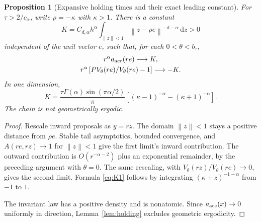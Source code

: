 \documentclass[pdflatex,iicol,sn-mathphys-ay]{sn-jnl}
\newtheorem{proposition}[theorem]{Proposition}
\theoremstyle{definition}\newtheorem{definition}[theorem]{Definition}
\theoremstyle{remark}\newtheorem{remark}[theorem]{Remark}
\numberwithin{equation}{section}
\newcommand{\norm}[1]{\left\lVert#1\right\rVert}\newcommand{\TV}{\mathrm{TV}}
\newcommand{\dd}{\,\mathrm d}\newcommand{\cA}{c_\alpha}\newcommand{\sg}{\operatorname{sigmoid}}
\newcommand{\1}{\mathbf 1}
\begin{document}
\begin{proposition}[Expansive holding times and their exact leading constant]\label{prop:holding}
For $\tau>2/\cA$, write $\rho=-\kappa$ with $\kappa>1$. There is a constant
\begin{equation}
K=C_{d,\alpha}h^\alpha\int_{\norm z<1}\norm{z-\rho e}^{-d-\alpha}\dd z>0\label{eq:K}
\end{equation}
independent of the unit vector $e$, such that, for each $0<\theta<b_\tau$,
\begin{equation}
\begin{gathered}
r^\alpha a_{\rm acc}(re)\longrightarrow K,\\
r^\alpha\left[PV_\theta(re)/V_\theta(re)-1\right]\longrightarrow-K.
\end{gathered}\label{eq:holdinglimits}
\end{equation}
In one dimension,
\begin{equation}
K=\frac{\tau\Gamma(\alpha)\sin(\pi\alpha/2)}{\pi}
\left[(\kappa-1)^{-\alpha}-(\kappa+1)^{-\alpha}\right].\label{eq:K1}
\end{equation}
The chain is not geometrically ergodic.
\end{proposition}
\begin{proof}
Rescale inward proposals as $y=rz$. The domain $\norm z<1$ stays a positive distance from $\rho e$. Stable tail asymptotics, bounded convergence, and $A(re,rz)\to1$ for $\norm z<1$ give the first limit's inward contribution. The outward contribution is $O(r^{-\alpha-2})$ plus an exponential remainder, by the preceding argument with $\theta=0$. The same rescaling, with $V_\theta(rz)/V_\theta(re)\to0$, gives the second limit. Formula \eqref{eq:K1} follows by integrating $(\kappa+z)^{-1-\alpha}$ from $-1$ to $1$.

The invariant law has a positive density and is nonatomic. Since $a_{\rm acc}(x)\to0$ uniformly in direction, Lemma~\ref{lem:holding} excludes geometric ergodicity.
\end{proof}
\end{document}
